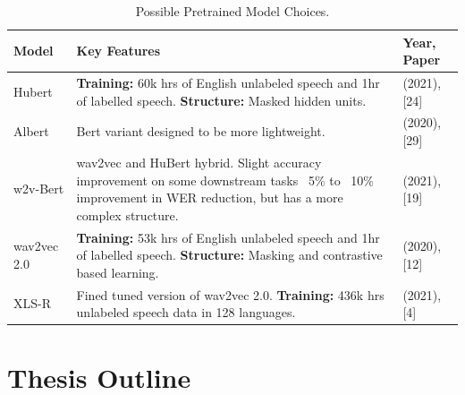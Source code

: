 \begin{table}[hbt!]
    \begin{center}
    \begin{tabular}{|m{3cm} || m{10cm} | m{3cm} |}
        \hline
        \textbf{Model} & \textbf{Key Features} & \textbf{Year, Paper}\\
        \hline
        Hubert & 
        \textbf{Training:} 60k hrs of English unlabeled speech and 1hr of labelled speech.\newline 
        \textbf{Structure:} Masked hidden units.
        & (2021), [24]\\
        \hline
        Albert & Bert variant designed to be more lightweight. &(2020), [29]\\
        \hline
        w2v-Bert & wav2vec and HuBert hybrid.\newline
        Slight accuracy improvement on some downstream tasks ~5\% to ~10\% improvement in WER reduction, 
        but has a more complex structure. &(2021), [19]\\
        \hline
        wav2vec 2.0 & 
        \textbf{Training:} 53k hrs of English unlabeled speech and 1hr of labelled speech.\newline
        \textbf{Structure:} Masking and contrastive based learning. \newline
        &(2020), [12]\\
        \hline
        XLS-R &
        Fined tuned version of wav2vec 2.0.\newline
        \textbf{Training:} 436k hrs unlabeled speech data in 128 languages. 
         &(2021), [4]\\
        \hline
    \end{tabular}
    \caption{Possible Pretrained Model Choices.}
    \label{tab:PretrainedModel}
    \end{center}
\end{table}

\chapter{Thesis Outline}\label{ch:outline}
